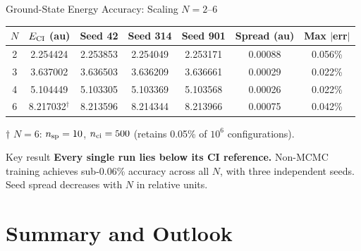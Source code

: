 \documentclass[aspectratio=169,10pt]{beamer}
\begin{document}
\begin{frame}{Ground-State Energy Accuracy: Scaling $N=2$--$6$}
  \begin{center}
    \renewcommand{\arraystretch}{1.30}
    \small
    \begin{tabular}{c|c|ccc|cc}
      \toprule
      $N$ & $E_{\rm CI}$ (au) &
      Seed 42 & Seed 314 & Seed 901 &
      Spread (au) & Max $|$err$|$ \\
      \midrule
      2 & 2.254424 &
        2.253853 & 2.254049 & 2.253171 &
        0.00088 & 0.056\% \\
      3 & 3.637002 &
        3.636503 & 3.636209 & 3.636661 &
        0.00029 & 0.022\% \\
      4 & 5.104449 &
        5.103305 & 5.103369 & 5.103568 &
        0.00026 & 0.022\% \\
      6 & 8.217032$^\dagger$ &
        8.213596 & 8.214344 & 8.213966 &
        0.00075 & 0.042\% \\
      \bottomrule
    \end{tabular}
    \normalsize
  \end{center}
  \vspace{0.15cm}
  \small$\dagger$ $N=6$: $n_{\rm sp}=10$, $n_{\rm ci}=500$ (retains 0.05\% of $10^6$ configurations).\normalsize

  \vspace{0.2cm}
  \begin{alertblock}{Key result}
    \textbf{Every single run lies below its CI reference.}
    Non-MCMC training achieves sub-0.06\% accuracy across all $N$,
    with three independent seeds. Seed spread decreases with $N$ in
    relative units.
  \end{alertblock}
\end{frame}


\section{Summary and Outlook}
\end{document}
